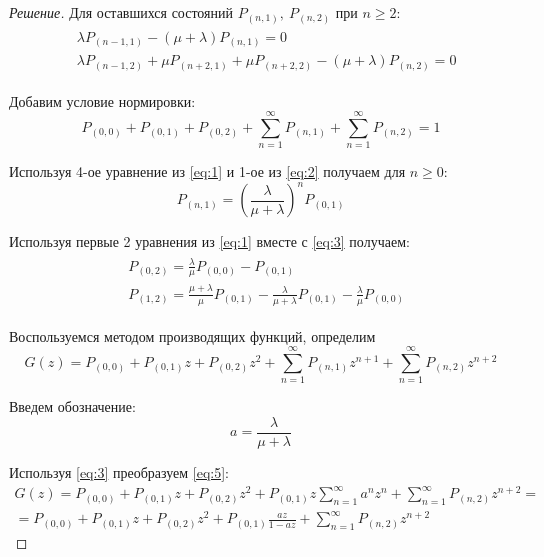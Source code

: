 \documentclass[12pt,a4paper]{article}
\begin{document}
\begin{proof}[Решение]
	Для оставшихся состояний $P_{(n, 1)}, \ P_{(n, 2)}$ при $n \geq 2$:
	\begin{align}\label{eq:2}
	\begin{split}
		&\lambda P_{(n-1, 1)} - (\mu + \lambda) P_{(n, 1)} = 0 \\
		&\lambda P_{(n-1, 2)} + \mu P_{(n+2, 1)} + \mu P_{(n+2, 2)} - (\mu + \lambda) P_{(n, 2)} = 0
	\end{split}
	\end{align}
	
	Добавим условие нормировки:
	\begin{equation}
		P_{(0, 0)} + P_{(0, 1)} + P_{(0, 2)} + \sum_{n=1}^{\infty}{P_{(n, 1)}} + \sum_{n=1}^{\infty}{P_{(n, 2)}} = 1
	\end{equation}
	
	Используя 4-ое уравнение из \eqref{eq:1} и 1-ое из \eqref{eq:2} получаем для $n \geq 0$:
	\begin{equation}\label{eq:3}
		P_{(n, 1)} = \left(\frac{\lambda}{\mu + \lambda}\right)^n P_{(0, 1)}
	\end{equation}
	
	Используя первые 2 уравнения из \eqref{eq:1} вместе с \eqref{eq:3} получаем:
	\begin{align}\label{eq:4}
	\begin{split}
		&P_{(0, 2)} = \frac{\lambda}{\mu} P_{(0, 0)} - P_{(0, 1)} \\
		&P_{(1, 2)} = \frac{\mu + \lambda}{\mu} P_{(0, 1)} - \frac{\lambda}{\mu + \lambda} P_{(0, 1)} - \frac{\lambda}{\mu} P_{(0, 0)}
	\end{split}
	\end{align}
	
	Воспользуемся методом производящих функций, определим
	\begin{equation}\label{eq:5}
		G(z) = P_{(0, 0)} + P_{(0, 1)} z + P_{(0, 2)} z^2 + \sum_{n=1}^{\infty}{P_{(n, 1)} z^{n+1}} + \sum_{n=1}^{\infty}{P_{(n, 2)} z^{n+2}}
	\end{equation}
	
	Введем обозначение:
	\begin{equation}\label{eq:a}
		a = \frac{\lambda}{\mu + \lambda}
	\end{equation}
	
	Используя \eqref{eq:3} преобразуем \eqref{eq:5}:
	\begin{multline}\label{eq:7}
		G(z) = P_{(0, 0)} + P_{(0, 1)} z + P_{(0, 2)} z^2 + P_{(0, 1)} z \sum_{n=1}^{\infty}{a^n z^n} + \sum_{n=1}^{\infty}{P_{(n, 2)} z^{n+2}} = \\ 
		= P_{(0, 0)} + P_{(0, 1)} z + P_{(0, 2)} z^2 + P_{(0, 1)} \frac{az}{1 - az} + \sum_{n=1}^{\infty}{P_{(n, 2)} z^{n+2}}
	\end{multline}
	

\end{proof}
\end{document}
